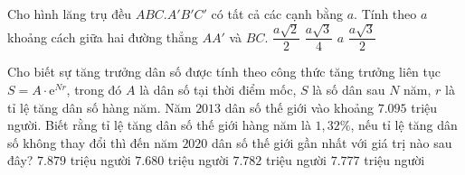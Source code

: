 \begin{ex}%
    Cho hình lăng trụ đều $ABC.A'B'C'$ có tất cả các cạnh bằng $a$. Tính theo $a$ khoảng cách giữa hai đường thẳng $AA'$ và $BC$.
     \choice
    {$\dfrac{a\sqrt{2}}{2}$}
    {$\dfrac{a\sqrt{3}}{4}$}
    {$a$}
    {\True $\dfrac{a\sqrt{3}}{2}$}
\end{ex}

\begin{ex}%
    Cho biết sự tăng trưởng dân số được tính theo công thức tăng trưởng liên tục $S=A\cdot \mathrm{e}^{Nr}$, trong đó $A$ là dân số tại thời điểm mốc, $S$ là số dân sau $N$ năm, $r$ là tỉ lệ tăng dân số hàng năm. Năm $2013$ dân số thế giới vào khoảng $7.095$ triệu người. Biết rằng tỉ lệ tăng dân số thế giới hàng năm là $1,32\%$, nếu tỉ lệ tăng dân số không thay đổi thì đến năm $2020$ dân số thế giới gần nhất với giá trị nào sau đây?
    \choice
    {$7.879$ triệu người}
    {$7.680$ triệu người}
    {\True $7.782$ triệu người}
    {$7.777$ triệu người}
\end{ex}

